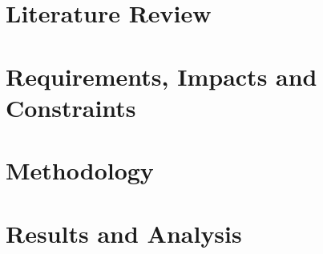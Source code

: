 \documentclass[Times,12pt,oneside,openany,print,index]{report}
\theoremstyle{plain}
\theoremstyle{definition}
\theoremstyle{remark}
\let\cleardoublepage=\clearpage %
\begin{document}
\chapter{Literature Review}
\label{ch:litreview}


\chapter{Requirements, Impacts and Constraints}
\label{ch:requirements}


\chapter{Methodology}
\label{ch:methodology}


\chapter{Results and Analysis}
\label{ch:results}


% 

\cleardoublepage
{}
\nocite{*}
\printbibliography
{}
\end{document}
